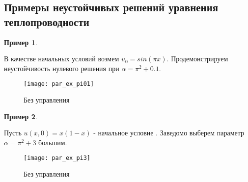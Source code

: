 \subsection{Примеры неустойчивых решений уравнения теплопроводности}
\vspace{1em}

\newtheorem{exmp}{Пример}

\begin{exmp}
\end{exmp}

В качестве начальных условий возмем $u_0 = sin(\pi x)$. Продемонстрируем 
неустойчивость нулевого решения при $\alpha = \pi^2 + 0.1$.

\begin{figure}[H]
    \centering
        \texttt{[image: par\_ex\_pi01]}
        \caption{Без управления}
        \label{fig:test1}
\end{figure}

\begin{exmp}
\end{exmp}

Пусть $u(x, 0) = x(1 - x)$ - начальное условие . Заведомо выберем параметр 
$\alpha = \pi^2 + 3$ большим. 

\begin{figure}[H]
    \centering
        \texttt{[image: par\_ex\_pi3]}
        \caption{Без управления}
        \label{fig:test1}
\end{figure}

